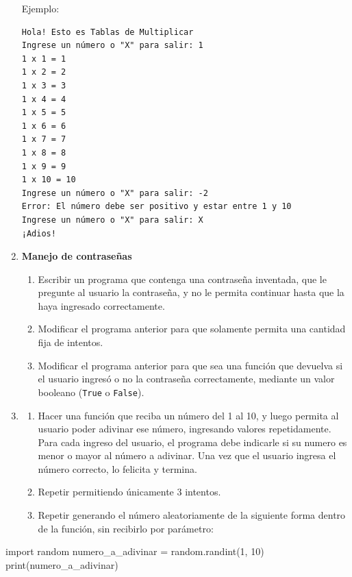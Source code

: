 \documentclass[
  letterpaper,
  DIV=11,
  numbers=noendperiod]{scrreprt}
\newenvironment{Shaded}{\begin{snugshade}}{\end{snugshade}}
\newcommand{\BuiltInTok}[1]{\textcolor[rgb]{0.00,0.23,0.31}{#1}}
\newcommand{\DecValTok}[1]{\textcolor[rgb]{0.68,0.00,0.00}{#1}}
\newcommand{\ImportTok}[1]{\textcolor[rgb]{0.00,0.46,0.62}{#1}}
\newcommand{\NormalTok}[1]{\textcolor[rgb]{0.00,0.23,0.31}{#1}}
\newcommand{\OperatorTok}[1]{\textcolor[rgb]{0.37,0.37,0.37}{#1}}
\providecommand{\tightlist}{%
  \setlength{\itemsep}{0pt}\setlength{\parskip}{0pt}}\usepackage{longtable,booktabs,array}
\begin{document}
\begin{enumerate}
  Ejemplo:

\begin{verbatim}
Hola! Esto es Tablas de Multiplicar
Ingrese un número o "X" para salir: 1
1 x 1 = 1
1 x 2 = 2
1 x 3 = 3
1 x 4 = 4
1 x 5 = 5
1 x 6 = 6
1 x 7 = 7
1 x 8 = 8
1 x 9 = 9
1 x 10 = 10
Ingrese un número o "X" para salir: -2
Error: El número debe ser positivo y estar entre 1 y 10
Ingrese un número o "X" para salir: X
¡Adios!
\end{verbatim}
\item
  \textbf{Manejo de contraseñas}

  \begin{enumerate}
  \def\labelenumii{\alph{enumii}.}
  \tightlist
  \item
    Escribir un programa que contenga una contraseña inventada, que le
    pregunte al usuario la contraseña, y no le permita continuar hasta
    que la haya ingresado correctamente.
  \item
    Modificar el programa anterior para que solamente permita una
    cantidad fija de intentos.
  \item
    Modificar el programa anterior para que sea una función que devuelva
    si el usuario ingresó o no la contraseña correctamente, mediante un
    valor booleano (\texttt{True} o \texttt{False}).
  \end{enumerate}
\item
  \begin{enumerate}
  \def\labelenumii{\alph{enumii}.}
  \item
    Hacer una función que reciba un número del 1 al 10, y luego permita
    al usuario poder adivinar ese número, ingresando valores
    repetidamente. Para cada ingreso del usuario, el programa debe
    indicarle si su numero es menor o mayor al número a adivinar. Una
    vez que el usuario ingresa el número correcto, lo felicita y
    termina.
  \item
    Repetir permitiendo únicamente 3 intentos.
  \item
    Repetir generando el número aleatoriamente de la siguiente forma
    dentro de la función, sin recibirlo por parámetro:
  \end{enumerate}
\end{enumerate}

\begin{Shaded}
\begin{Highlighting}[]
\ImportTok{import}\NormalTok{ random}
\NormalTok{numero\_a\_adivinar }\OperatorTok{=}\NormalTok{ random.randint(}\DecValTok{1}\NormalTok{, }\DecValTok{10}\NormalTok{)}
\BuiltInTok{print}\NormalTok{(numero\_a\_adivinar)}
\end{Highlighting}
\end{Shaded}
\end{document}
